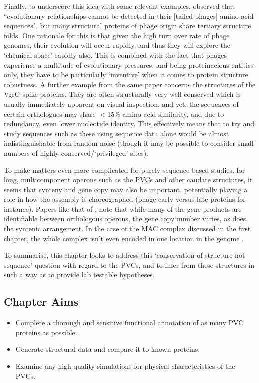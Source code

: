 Finally, to underscore this idea with some relevant examples, \cite{Leiman2010} observed that ``evolutionary relationships cannot be detected in their [tailed phages] amino acid sequences", but many structural proteins of phage origin share tertiary structure folds. One rationale for this is that given the high turn over rate of phage genomes, their evolution will occur rapidly, and thus they will explore the `chemical space' rapidly also. This is combined with the fact that phages experience a multitude of evolutionary pressures, and being proteinacious entities only, they have to be particularly `inventive' when it comes to protein structure robustness. A further example from the same paper concerns the structures of the VgrG spike proteins. They are often structurally very well conserved which is usually immediately apparent on visual inspection, and yet, the sequences of certain orthologues may share $<$15\% amino acid similarity, and due to redundancy, even lower nucleotide identity. This effectively means that to try and study sequences such as these using sequence data alone would be almost indistinguishable from random noise (though it may be possible to consider small numbers of highly conserved/`privileged' sites).

To make matters even more complicated for purely sequence based studies, for long, multicomponent operons such as the PVCs and other caudate structures, it seems that synteny and gene copy may also be important, potentially playing a role in how the assembly is choreographed (phage early versus late proteins for instance). Papers like that of \cite{Sarris2014}, note that while many of the gene products are identifiable between orthologous operons, the gene copy number varies, as does the syntenic arrangement. In the case of the MAC complex discussed in the first chapter, the whole complex isn't even encoded in one location in the genome \citep{Shikuma2014}. 


To summarise, this chapter looks to address this `conservation of structure not sequence' question with regard to the PVCs, and to infer from these structures in such a way as to provide lab testable hypotheses.

\subsection*{Chapter Aims}

\begin{itemize}
	\item Complete a thorough and sensitive functional annotation of as many PVC proteins as possible.
	\item Generate structural data and compare it to known proteins.
	\item Examine any high quality simulations for physical characteristics of the PVCs.

\end{itemize}

